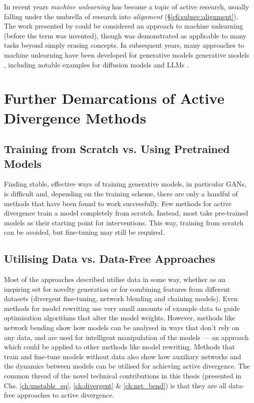 In recent years \textit{machine unlearning} \citep{bourtoule2021machine} has become a topic of active research, usually falling under the umbrella of research into \textit{alignment} (\S \ref{c6:subsec:alignment}). 
The work presented by \cite{bau2020rewriting} could be considered an approach to machine unlearning (before the term was invented), though was demonstrated as applicable to many  tasks beyond simply erasing concepts.
In subsequent years, many approaches to machine unlearning have been developed for generative models generative models \citep{liu2024machine}, including notable examples for diffusion models \citep{gandikota2023erasing} and LLMs \citep{zhao2023learning}.

\section{Further Demarcations of Active Divergence Methods}

\subsection{Training from Scratch vs. Using Pretrained Models}

Finding stable, effective ways of training generative models, in particular GANs, is difficult and, depending on the training scheme, there are only a handful of methods that have been found to work successfully. Few methods for active divergence train a model completely from scratch. Instead, most take pre-trained models as their starting point for interventions. This way, training from scratch can be avoided, but fine-tuning may still be required. 


\subsection{Utilising Data vs. Data-Free Approaches}
\label{c6:subsec:datafree}

Most of the approaches described utilise data in some way, whether as an inspiring set for novelty generation or for combining features from different datasets (divergent fine-tuning, network blending and chaining models). 
Even methods for model rewriting use very small amounts of example data to guide optimisation algorithms that alter the model weights. 
However, methods like network bending show how models can be analysed in ways that don't rely on any data, and are used for intelligent manipulation of the models --- an approach which could be applied to other methods like model rewriting. 
Methods that train and fine-tune models without data also show how auxiliary networks and the dynamics between models can be utilised for achieving active divergence.
The common thread of the novel technical contributions in this thesis (presented in Chs. \ref{ch:unstable_eq}, \ref{ch:divergent} \& \ref{ch:net_bend}) is that they are all data-free approaches to active divergence.

